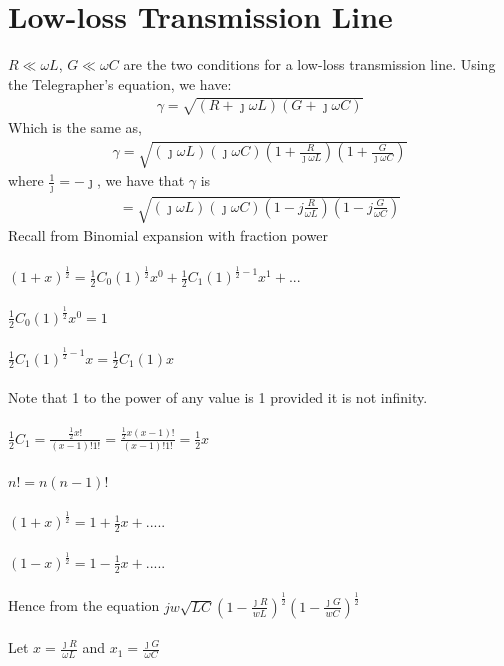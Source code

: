 \section{Low-loss Transmission Line}
$R \ll \omega L$, $G \ll \omega C$ are the two conditions for a low-loss transmission line. Using the Telegrapher's equation, we have:
\begin{align*}
\gamma = \sqrt{(R + \jmath\omega L)(G + \jmath\omega C)}
\end{align*}
Which is the same as,
\begin{align*}
\gamma = \sqrt{{(\jmath\omega L)(\jmath\omega C)(1 + \frac{R}{\jmath\omega L})(1 + \frac{G}{\jmath\omega C})}}
\end{align*}
where $\frac{1}{\jmath} = -\jmath$, we have that $\gamma$ is
\begin{align*}
= \sqrt{{(\jmath\omega L)(\jmath\omega C)(1 - j\frac{R}{\omega L})(1 - j\frac{G}{\omega C})}}
\end{align*}
Recall from Binomial expansion with fraction power\\\\
$(1 + x)^{\frac{1}{2}} = \frac{1}{2}C_0(1)^{\frac{1}{2}}x^0 + \frac{1}{2}C_1(1)^{{\frac{1}{2}} - 1}x^1 + ...$\\\\
$\frac{1}{2}C_0(1)^{\frac{1}{2}}x^0 = 1$\\\\
$\frac{1}{2}C_1(1)^{\frac{1}{2} - 1}x = \frac{1}{2}C_1(1)x$\\\\
Note that 1 to the power of any value is 1 provided it is not infinity.\\\\
$\frac{1}{2}C_1 = \frac{\frac{1}{2}x!}{(x - 1)!1!} = \frac{\frac{1}{2}x(x-1)!}{(x-1)!1!} = \frac{1}{2}x$\\\\
$n! = n(n - 1)!$\\\\
$(1 + x)^{\frac{1}{2}} = 1 + \frac{1}{2}x + .....$\\\\
$(1 - x)^{\frac{1}{2}} = 1 - \frac{1}{2}x + .....$\\\\
Hence from the equation
$jw\sqrt{LC}(1 - \frac{\jmath R}{wL})^{\frac{1}{2}}(1 - \frac{\jmath G}{wC})^{\frac{1}{2}}$\\\\
Let $x = \frac{\jmath R}{\omega L}$ and $x_1 = \frac{\jmath G}{\omega C}$\\\\
